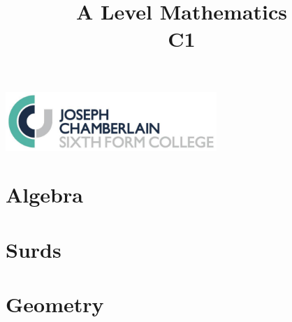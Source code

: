 \documentclass[12pt]{article}
\title{A Level Mathematics \\ C1}
\author{}
\date{}
\begin{document}

\maketitle

\begin{center}
\includegraphics[width=8cm]{../jcclogo.PNG}
\end{center}

\newpage

\thispagestyle{plain}
\tableofcontents

			\newpage
			\section{Algebra}

			
				\newpage
				

				
				\newpage
				

				
				\newpage
				

				
				\newpage
				

				
				\newpage
				
			
			\newpage
			\section{Surds}

			
				\newpage
				

				
				\newpage
				

				
				\newpage
				

				
				\newpage
				

				
				\newpage
				

			\newpage
			\section{Geometry}
			
				\newpage
				
\end{document}
